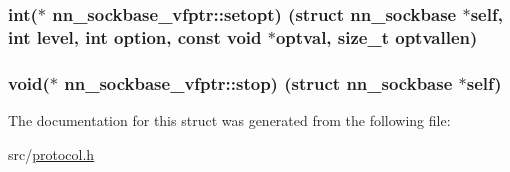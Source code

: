 \subsubsection[{setopt}]{\setlength{\rightskip}{0pt plus 5cm}int($\ast$ nn\+\_\+sockbase\+\_\+vfptr\+::setopt) (struct {\bf nn\+\_\+sockbase} $\ast$self, int level, int option, const void $\ast$optval, size\+\_\+t optvallen)}\hypertarget{structnn__sockbase__vfptr_a910ea7f4cb9f53ceb74ccf56d91ec3df}{}\label{structnn__sockbase__vfptr_a910ea7f4cb9f53ceb74ccf56d91ec3df}
\subsubsection[{stop}]{\setlength{\rightskip}{0pt plus 5cm}void($\ast$ nn\+\_\+sockbase\+\_\+vfptr\+::stop) (struct {\bf nn\+\_\+sockbase} $\ast$self)}\hypertarget{structnn__sockbase__vfptr_a87d584787fda9a1e73bce636a9b0e3dc}{}\label{structnn__sockbase__vfptr_a87d584787fda9a1e73bce636a9b0e3dc}


The documentation for this struct was generated from the following file\+:\begin{DoxyCompactItemize}
\item 
src/\hyperlink{protocol_8h}{protocol.\+h}\end{DoxyCompactItemize}
